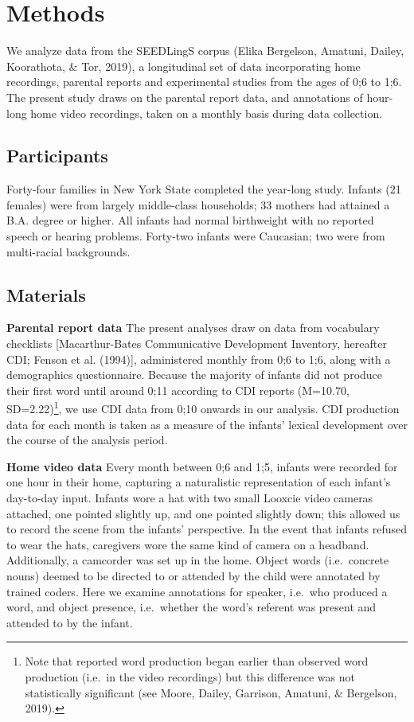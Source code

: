 \documentclass[
  english,
  man,floatsintext]{apa6}
\begin{document}
\hypertarget{methods}{%
\section{Methods}\label{methods}}

We analyze data from the SEEDLingS corpus (Elika Bergelson, Amatuni, Dailey, Koorathota, \& Tor, 2019), a longitudinal set of data incorporating home recordings, parental reports and experimental studies from the ages of 0;6 to 1;6. The present study draws on the parental report data, and annotations of hour-long home video recordings, taken on a monthly basis during data collection.

\hypertarget{participants}{%
\subsection{Participants}\label{participants}}

Forty-four families in New York State completed the year-long study. Infants (21 females) were from largely middle-class households; 33 mothers had attained a B.A. degree or higher. All infants had normal birthweight with no reported speech or hearing problems. Forty-two infants were Caucasian; two were from multi-racial backgrounds.

\hypertarget{materials}{%
\subsection{Materials}\label{materials}}

\textbf{Parental report data} The present analyses draw on data from vocabulary checklists {[}Macarthur-Bates Communicative Development Inventory, hereafter CDI; Fenson et al. (1994){]}, administered monthly from 0;6 to 1;6, along with a demographics questionnaire. Because the majority of infants did not produce their first word until around 0;11 according to CDI reports (M=10.70, SD=2.22)\footnote{Note that reported word production began earlier than observed word production (i.e.~in the video recordings) but this difference was not statistically significant (see Moore, Dailey, Garrison, Amatuni, \& Bergelson, 2019).}, we use CDI data from 0;10 onwards in our analysis. CDI production data for each month is taken as a measure of the infants' lexical development over the course of the analysis period.

\textbf{Home video data} Every month between 0;6 and 1;5, infants were recorded for one hour in their home, capturing a naturalistic representation of each infant's day-to-day input. Infants wore a hat with two small Looxcie video cameras attached, one pointed slightly up, and one pointed slightly down; this allowed us to record the scene from the infants' perspective. In the event that infants refused to wear the hats, caregivers wore the same kind of camera on a headband. Additionally, a camcorder was set up in the home. Object words (i.e.~concrete nouns) deemed to be directed to or attended by the child were annotated by trained coders. Here we examine annotations for speaker, i.e.~who produced a word, and object presence, i.e.~whether the word's referent was present and attended to by the infant.
\end{document}
